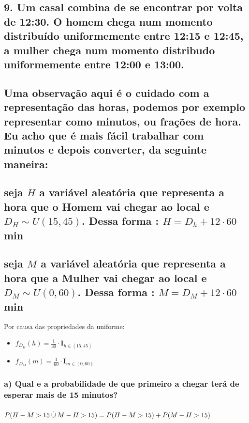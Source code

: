 \documentclass[portuguese]{article}
\begin{document}
\subsection*{\textmd{9. Um casal combina de se encontrar por volta de 12:30. O
homem chega num momento distribuído uniformemente entre 12:15 e 12:45,
a mulher chega num momento distribudo uniformemente entre 12:00 e
13:00. }}


\subsection*{\textmd{Uma observação aqui é o cuidado com a representação das horas,
podemos por exemplo representar como minutos, ou frações de hora.
Eu acho que é mais fácil trabalhar com minutos e depois converter,
da seguinte maneira:}}


\subsection*{\textmd{seja $H$ a variável aleatória que representa a hora que
o Homem vai chegar ao local e $D{}_{H}\sim U(15,45)$. Dessa forma
: $H=D_{h}+12\cdot60$ min}}


\subsection*{\textmd{seja $M$ a variável aleatória que representa a hora que
a Mulher vai chegar ao local e $D{}_{M}\sim U(0,60)$. Dessa forma
: $M=D_{M}+12\cdot60$ min}}

Por causa das propriedades da uniforme:
\begin{itemize}
\item $f_{D{}_{H}}(h)=\frac{1}{30}\cdot\mathbf{I}_{h\in(15,45)}$
\item $f_{D{}_{M}}(m)=\frac{1}{60}\cdot\mathbf{I}_{m\in(0,60)}$
\end{itemize}

\subsubsection*{\textmd{a) Qual e a probabilidade de que primeiro a chegar terá de
esperar mais de 15 minutos? }}


\subsubsection*{\textmd{$P(H-M>15\protect\overset{.}{\cup}M-H>15)=P(H-M>15)+P(M-H>15)$}}
\end{document}
